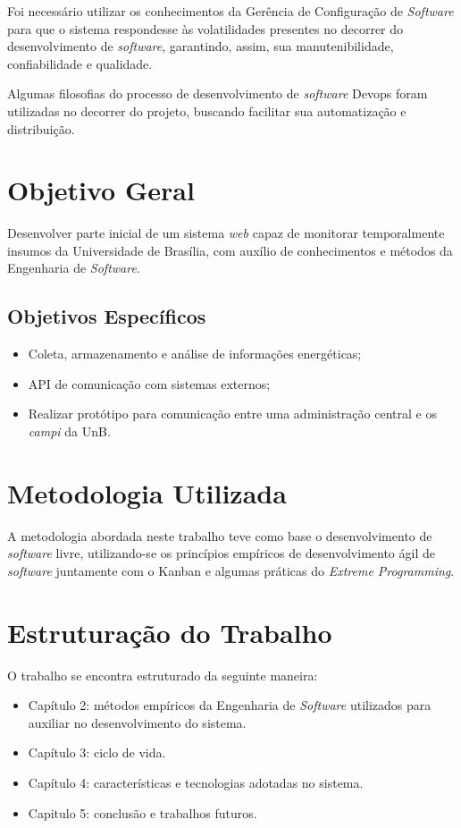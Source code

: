 Foi necessário utilizar os conhecimentos da Gerência de Configuração de \textit{Software} para que o sistema respondesse às volatilidades presentes no decorrer do desenvolvimento de \textit{software}, garantindo, assim, sua manutenibilidade, confiabilidade e qualidade.

Algumas filosofias do processo de desenvolvimento de \textit{software} Devops foram utilizadas no decorrer do projeto, buscando facilitar sua automatização e distribuição.

\section{Objetivo Geral}
Desenvolver parte inicial de um sistema \textit{web} capaz de monitorar temporalmente insumos da Universidade de Brasília, com auxílio de conhecimentos e métodos da Engenharia de \textit{Software}.

\subsection{Objetivos Específicos}

\begin{itemize}
    \item Coleta, armazenamento e análise de informações energéticas;
    \item API de comunicação com sistemas externos;
    \item Realizar protótipo para comunicação entre uma administração central e os \textit{campi} da UnB.
\end{itemize}

\section{Metodologia Utilizada}
A metodologia abordada neste trabalho teve como base o desenvolvimento de \textit{software} livre, utilizando-se os princípios empíricos de desenvolvimento ágil de \textit{software} juntamente com o Kanban e algumas práticas do \textit{Extreme Programming}.

\section{Estruturação do Trabalho}
O trabalho se encontra estruturado da seguinte maneira:

\begin{itemize}
    \item Capítulo 2: métodos empíricos da Engenharia de \textit{Software} utilizados para
    auxiliar no desenvolvimento do sistema.
    \item Capítulo 3: ciclo de vida.
    \item Capítulo 4: características e tecnologias adotadas no sistema.
    \item Capitulo 5: conclusão e trabalhos futuros.
\end{itemize}